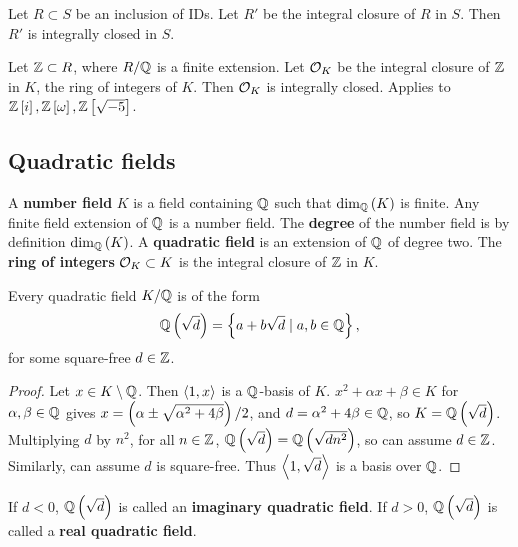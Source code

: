 \begin{theorem}
Let $ R \subset S $ be an inclusion of IDs. Let $ R' $ be the integral closure of $ R $ in $ S $. Then $ R' $ is integrally closed in $ S $.
\end{theorem}

\begin{example*}
Let $ \mathbb{Z} \subset R $, where $ R / \mathbb{Q} $ is a finite extension. Let $ \mathcal{O}_K $ be the integral closure of $ \mathbb{Z} $ in $ K $, the ring of integers of $ K $. Then $ \mathcal{O}_K $ is integrally closed. Applies to $ \mathbb{Z}\left[ i \right], \mathbb{Z}\left[ \omega \right], \mathbb{Z}\left[ \sqrt{-5} \right] $.
\end{example*}

\pagebreak

\subsection{Quadratic fields}

A \textbf{number field} $ K $ is a field containing $ \mathbb{Q} $ such that $ \dim_{\mathbb{Q}}\left( K \right) $ is finite. Any finite field extension of $ \mathbb{Q} $ is a number field. The \textbf{degree} of the number field is by definition $ \dim_{\mathbb{Q}}\left( K \right) $. A \textbf{quadratic field} is an extension of $ \mathbb{Q} $ of degree two. The \textbf{ring of integers} $ \mathcal{O}_K \subset K $ is the integral closure of $ \mathbb{Z} $ in $ K $.

\begin{lemma}
Every quadratic field $ K / \mathbb{Q} $ is of the form
$$ \mathbb{Q}\left( \sqrt{d} \right) = \left\{ a + b\sqrt{d} \mid a, b \in \mathbb{Q} \right\}, $$
for some square-free $ d \in \mathbb{Z} $.
\end{lemma}

\begin{proof}
Let $ x \in K \setminus \mathbb{Q} $. Then $ \left\langle 1, x \right\rangle $ is a $ \mathbb{Q} $-basis of $ K $. $ x^2 + \alpha x + \beta \in K $ for $ \alpha, \beta \in \mathbb{Q} $ gives $ x = \left( \alpha \pm\sqrt{\alpha^2 + 4\beta} \right) / 2 $, and $ d = \alpha^2 + 4\beta \in \mathbb{Q} $, so $ K = \mathbb{Q}\left( \sqrt{d} \right) $. Multiplying $ d $ by $ n^2 $, for all $ n \in \mathbb{Z} $, $ \mathbb{Q}\left( \sqrt{d} \right) = \mathbb{Q}\left( \sqrt{dn^2} \right) $, so can assume $ d \in \mathbb{Z} $. Similarly, can assume $ d $ is square-free. Thus $ \left\langle 1, \sqrt{d} \right\rangle $ is a basis over $ \mathbb{Q} $.
\end{proof}

\begin{remark*}
If $ d < 0 $, $ \mathbb{Q}\left( \sqrt{d} \right) $ is called an \textbf{imaginary quadratic field}. If $ d > 0 $, $ \mathbb{Q}\left( \sqrt{d} \right) $ is called a \textbf{real quadratic field}.
\end{remark*}

